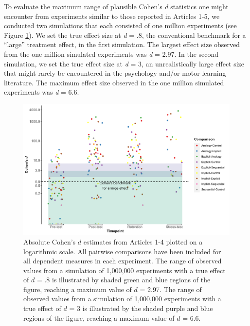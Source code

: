 \documentclass[
  english,
  man, donotrepeattitle,floatsintext]{apa7}
\begin{document}
To evaluate the maximum range of plausible Cohen's \emph{d} statistics one might encounter from experiments similar to those reported in Articles 1-5, we conducted two simulations that each consisted of one million experiments (see Figure \ref{fig:fig1}). We set the true effect size at \emph{d} = .8, the conventional benchmark for a ``large'' treatment effect, in the first simulation. The largest effect size observed from the one million simulated experiments was \emph{d} = 2.97. In the second simulation, we set the true effect size at \emph{d} = 3, an unrealistically large effect size that might rarely be encountered in the psychology and/or motor learning literature. The maximum effect size observed in the one million simulated experiments was \emph{d} = 6.6.



\begin{figure}

{\centering \includegraphics[width=1\linewidth,height=1\textheight]{../../figs/fig1} 

}

\caption{Absolute Cohen's \(d\) estimates from Articles 1-4 plotted on a logarithmic scale. All pairwise comparisons have been included for all dependent measures in each experiment. The range of observed values from a simulation of 1,000,000 experiments with a true effect of \(d\) = .8 is illustrated by shaded green and blue regions of the figure, reaching a maximum value of \(d\) = 2.97. The range of observed values from a simulation of 1,000,000 experiments with a true effect of \(d\) = 3 is illustrated by the shaded purple and blue regions of the figure, reaching a maximum value of \(d\) = 6.6.}\label{fig:fig1}
\end{figure}
\end{document}
